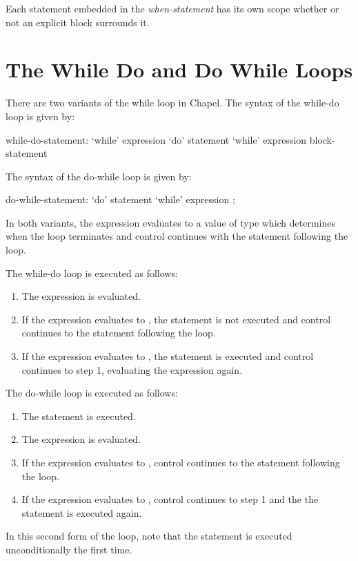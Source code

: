 Each statement embedded in the {\em when-statement} has its own scope
whether or not an explicit block surrounds it.

\section{The While Do and Do While Loops}
\label{The_While_and_Do_While_Loops}

There are two variants of the while loop in Chapel.  The syntax of the
while-do loop is given by:
\begin{syntax}
while-do-statement:
  `while' expression `do' statement
  `while' expression block-statement
\end{syntax}
The syntax of the do-while loop is given by:
\begin{syntax}
do-while-statement:
  `do' statement `while' expression ;
\end{syntax}
In both variants, the expression evaluates to a value of type 
which determines when the loop terminates and control continues with
the statement following the loop.

The while-do loop is executed as follows:
\begin{enumerate}
\item The expression is evaluated.
\item If the expression evaluates to , the statement is
  not executed and control continues to the statement following the
  loop.
\item If the expression evaluates to , the statement is
  executed and control continues to step 1, evaluating the expression
  again.
\end{enumerate}

The do-while loop is executed as follows:
\begin{enumerate}
\item The statement is executed.
\item The expression is evaluated.
\item If the expression evaluates to , control continues
  to the statement following the loop.
\item If the expression evaluates to , control continues to
  step 1 and the the statement is executed again.
\end{enumerate}
In this second form of the loop, note that the statement is executed
unconditionally the first time.

